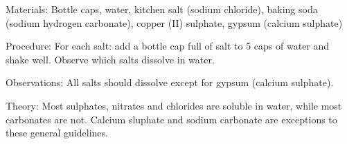 \begin{multicols}{2}
\begin{description*}
\item[Materials:]{Bottle caps, water, kitchen salt (sodium chloride), baking soda (sodium hydrogen carbonate), copper (II) sulphate, gypsum (calcium sulphate)}
\item[Procedure:]{For each salt: add a bottle cap full of salt to 5 caps of water and shake well. Observe which salts dissolve in water.}
\item[Observations:]{All salts should dissolve except for gypsum (calcium sulphate).}
\item[Theory:]{Most sulphates, nitrates and chlorides are soluble in water, while most carbonates are not. Calcium sluphate and sodium carbonate are exceptions to these general guidelines.}
\end{description*}

%
%


\end{multicols}

\pagebreak